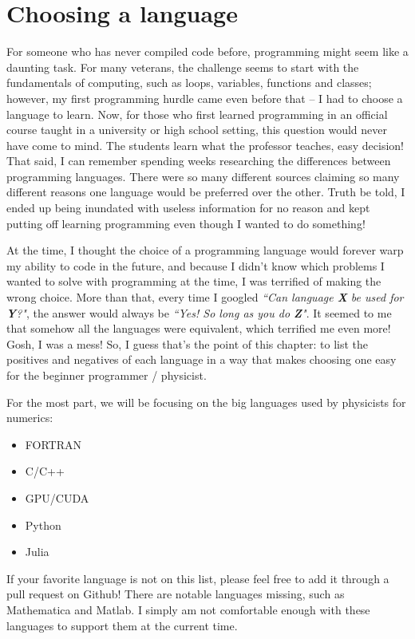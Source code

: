 \chapter{Choosing a language}

For someone who has never compiled code before, programming might seem like a daunting task. 
For many veterans, the challenge seems to start with the fundamentals of computing, such as loops, variables, functions and classes; however, my first programming hurdle came even before that -- I had to choose a language to learn.
Now, for those who first learned programming in an official course taught in a university or high school setting, this question would never have come to mind. 
The students learn what the professor teaches, easy decision!
That said, I can remember spending weeks researching the differences between programming languages.
There were so many different sources claiming so many different reasons one language would be preferred over the other.
Truth be told, I ended up being inundated with useless information for no reason and kept putting off learning programming even though I wanted to do something!

At the time, I thought the choice of a programming language would forever warp my ability to code in the future, and because I didn't know which problems I wanted to solve with programming at the time, I was terrified of making the wrong choice. 
More than that, every time I googled \textit{``Can language \textbf{X} be used for \textbf{Y}?"}, the answer would always be \textit{``Yes! So long as you do \textbf{Z}"}.
It seemed to me that somehow all the languages were equivalent, which terrified me even more!
Gosh, I was a mess!
So, I guess that's the point of this chapter: to list the positives and negatives of each language in a way that makes choosing one easy for the beginner programmer / physicist.

For the most part, we will be focusing on the big languages used by physicists for numerics:
\begin{itemize}
\item FORTRAN
\item C/C++
\item GPU/CUDA
\item Python
\item Julia
\end{itemize}

If your favorite language is not on this list, please feel free to add it through a pull request on Github! 
There are notable languages missing, such as Mathematica and Matlab.
I simply am not comfortable enough with these languages to support them at the current time.

